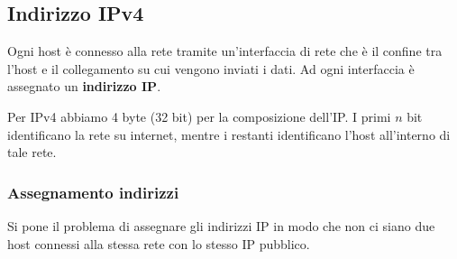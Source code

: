 \subsection{Indirizzo IPv4}
Ogni host è connesso alla rete tramite un'interfaccia di rete che è il confine tra l'host e il 
collegamento su cui vengono inviati i dati. Ad ogni interfaccia è assegnato un 
\textbf{indirizzo IP}.

Per IPv4 abbiamo 4 byte (32 bit) per la composizione dell'IP. I primi $n$ bit identificano la rete
su internet, mentre i restanti identificano l'host all'interno di tale rete.

\subsubsection{Assegnamento indirizzi}
Si pone il problema di assegnare gli indirizzi IP in modo che non ci siano due host connessi alla
stessa rete con lo stesso IP pubblico.

